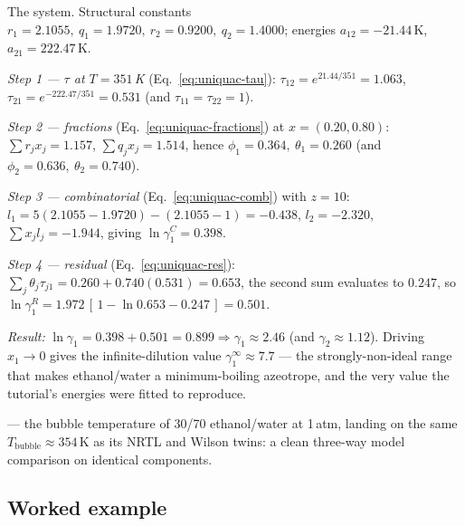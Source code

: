 \documentclass[11pt,a4paper]{article}
\begin{document}
\begin{example}[UNIQUAC $\gamma$ for ethanol(1)/water(2) at $351$\,K, $x_1=0.20$]
The 
system. Structural constants $r_1=2.1055,\ q_1=1.9720,\ r_2=0.9200,\
q_2=1.4000$; energies $a_{12}=-21.44\,$K, $a_{21}=222.47\,$K.

\emph{Step 1 --- $\tau$ at $T=351\,$K} (Eq.~\ref{eq:uniquac-tau}):
$\tau_{12}=e^{21.44/351}=1.063$, $\tau_{21}=e^{-222.47/351}=0.531$
(and $\tau_{11}=\tau_{22}=1$).

\emph{Step 2 --- fractions} (Eq.~\ref{eq:uniquac-fractions}) at
$x=(0.20,0.80)$: $\sum r_jx_j = 1.157$, $\sum q_jx_j = 1.514$, hence
$\phi_1=0.364,\ \theta_1=0.260$ (and $\phi_2=0.636,\ \theta_2=0.740$).

\emph{Step 3 --- combinatorial} (Eq.~\ref{eq:uniquac-comb}) with $z=10$:
$l_1=5(2.1055-1.9720)-(2.1055-1)=-0.438$, $l_2=-2.320$,
$\sum x_j l_j = -1.944$, giving $\ln\gamma_1^{C}=0.398$.

\emph{Step 4 --- residual} (Eq.~\ref{eq:uniquac-res}):
$\sum_j\theta_j\tau_{j1}=0.260+0.740(0.531)=0.653$, the second sum
evaluates to $0.247$, so
$\ln\gamma_1^{R}=1.972\,[\,1-\ln 0.653 - 0.247\,]=0.501$.

\emph{Result:} $\ln\gamma_1 = 0.398+0.501=0.899 \Rightarrow
\gamma_1\approx 2.46$ (and $\gamma_2\approx 1.12$). Driving $x_1\to 0$
gives the infinite-dilution value $\gamma_1^{\infty}\approx 7.7$ --- the
strongly-non-ideal range that makes ethanol/water a minimum-boiling
azeotrope, and the very value the tutorial's \file{thermoPackage} energies
were fitted to reproduce.
\end{example}

\begin{tutoriallink}
 --- the
bubble temperature of 30/70 ethanol/water at 1\,atm, landing on the same
$T_{\mathrm{bubble}}\approx 354\,$K as its NRTL and Wilson twins: a clean
three-way model comparison on identical components.
\end{tutoriallink}

\subsection{Worked example}
\end{document}
